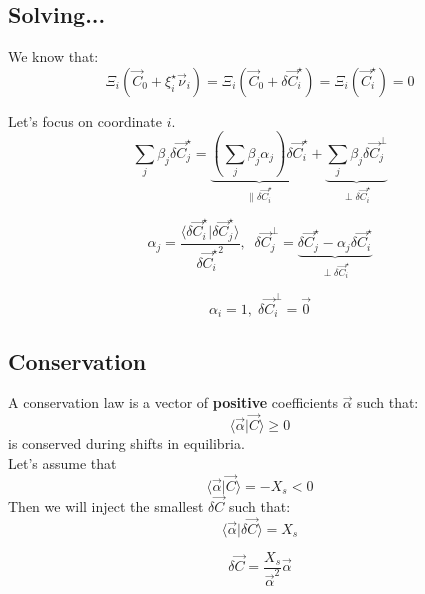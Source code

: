 \documentclass[aps,12pt]{revtex4}
\begin{document}
 
\subsection{Solving...}
We know that:
\begin{equation}
	\Xi_i(\vec C_0 + \xi_i^\star \vec \nu _i) = \Xi_i(\vec C_0 + \delta \vec C_i^\star) = \Xi_i(\vec C_i^\star) = 0
\end{equation}

Let's focus on coordinate $i$.
\begin{equation}
	\sum_j \beta_j \delta \vec C_j ^\star = 
	\underbrace{\left( \sum_j \beta_j \alpha_j \right) \delta \vec C_i^\star}_{\parallel \delta \vec C_i^\star} +
	\underbrace{\sum_j \beta_j \delta \vec C_j^\perp}_{\perp \delta \vec C_i^\star}
\end{equation}

\begin{equation}
	\alpha_j = \dfrac{\langle \delta \vec C_i ^\star\vert \delta \vec C_j ^\star\rangle}{ {\delta \vec C_i ^\star}^2 }
	,\;\;
	\delta \vec C_j^\perp = \underbrace{\delta \vec C_j ^\star - \alpha_j \delta \vec C_i ^\star}_{\perp \delta \vec C_i^\star}
\end{equation}

\begin{equation}
	\alpha_i = 1, \; \delta \vec C_i^\perp = \vec 0
\end{equation}

\subsection{Conservation}

A conservation law is a vector of {\bf positive} coefficients $\vec \alpha$ such that:
\begin{equation}
	\langle \vec \alpha \vert \vec C \rangle \geq 0
\end{equation}
is conserved during shifts in equilibria.\\
Let's assume that
\begin{equation}
	\langle \vec \alpha \vert \vec C \rangle = -X_s < 0 
\end{equation}
Then we will inject the smallest $\delta \vec C$ such that:
\begin{equation}
	\langle \vec \alpha \vert \delta \vec C \rangle = X_s
\end{equation}

\begin{equation}
	\delta \vec C = \dfrac{X_s}{\vec\alpha^2} \vec{\alpha}
\end{equation}
\end{document}
